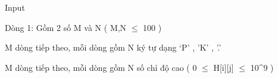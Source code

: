 Input
 

Dòng 1: Gồm 2 số M và N ( M,N  $\le$  100 )

M dòng tiếp theo, mỗi dòng gồm N ký tự dạng ‘P’ , ’K’ , ’.’

M dòng tiếp theo, mỗi dòng gồm N số chỉ độ cao ( 0  $\le$  H[i][j]  $\le$  10^9 )

 

 

 